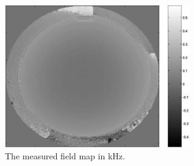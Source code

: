 \documentclass[journal]{IEEEtran}
\numberwithin{equation}{section}
\numberwithin{table}{section}
\numberwithin{figure}{section}
\begin{document}
\begin{figure}[ht!] 
\begin{center}
\includegraphics[width=8cm]{pics/fieldmap.jpg} 
\end{center}
\caption{The measured field map in kHz.}
\label{Fig:fieldmap}
\end{figure}
\end{document}
